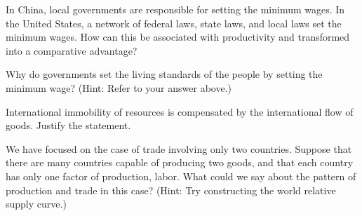 \documentclass[11pt,letterpaper]{exam}
\begin{document}
\begin{questions}
\question In China, local governments are responsible for setting the minimum wages. In the United States, a network of federal laws, state laws, and local laws set the minimum wages. How can this be associated with productivity and transformed into a comparative advantage?

\question Why do governments set the living standards of the people by setting the minimum wage? (Hint: Refer to your answer above.)


\question International immobility of resources is compensated by the international flow of goods. Justify the statement.

\question We have focused on the case of trade involving only two countries. Suppose that there are many countries capable of producing two goods, and that each country has only one factor of production, labor. What could we say about the pattern of production and trade in this case? (Hint: Try constructing the world relative supply curve.)




\end{questions}
\end{document}
